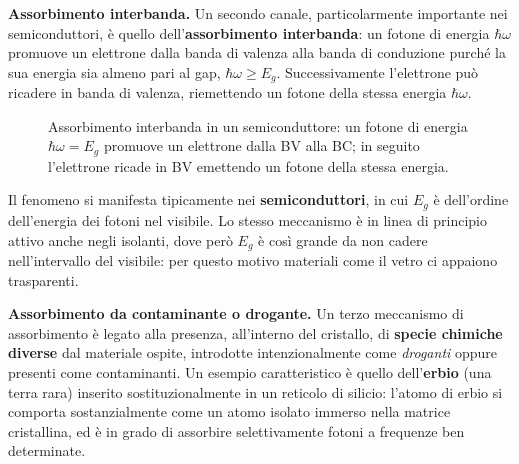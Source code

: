 \textbf{Assorbimento interbanda.} Un secondo canale, particolarmente importante nei semiconduttori, è quello dell'\textbf{assorbimento interbanda}: un fotone di energia \( \hbar \omega \) promuove un elettrone dalla banda di valenza alla banda di conduzione purché la sua energia sia almeno pari al gap, \( \hbar \omega \geq E_g \). Successivamente l'elettrone può ricadere in banda di valenza, riemettendo un fotone della stessa energia \( \hbar \omega \).

\begin{figure}[htbp]
    \centering
    \caption{Assorbimento interbanda in un semiconduttore: un fotone di energia \( \hbar \omega = E_g \) promuove un elettrone dalla BV alla BC; in seguito l'elettrone ricade in BV emettendo un fotone della stessa energia.}
    \label{fig:assorbimento_interbanda}
\end{figure}

Il fenomeno si manifesta tipicamente nei \textbf{semiconduttori}, in cui \( E_g \) è dell'ordine dell'energia dei fotoni nel visibile. Lo stesso meccanismo è in linea di principio attivo anche negli isolanti, dove però \( E_g \) è così grande da non cadere nell'intervallo del visibile: per questo motivo materiali come il vetro ci appaiono trasparenti.

\textbf{Assorbimento da contaminante o drogante.} Un terzo meccanismo di assorbimento è legato alla presenza, all'interno del cristallo, di \textbf{specie chimiche diverse} dal materiale ospite, introdotte intenzionalmente come \emph{droganti} oppure presenti come contaminanti. Un esempio caratteristico è quello dell'\textbf{erbio} (una terra rara) inserito sostituzionalmente in un reticolo di silicio: l'atomo di erbio si comporta sostanzialmente come un atomo isolato immerso nella matrice cristallina, ed è in grado di assorbire selettivamente fotoni a frequenze ben determinate.

